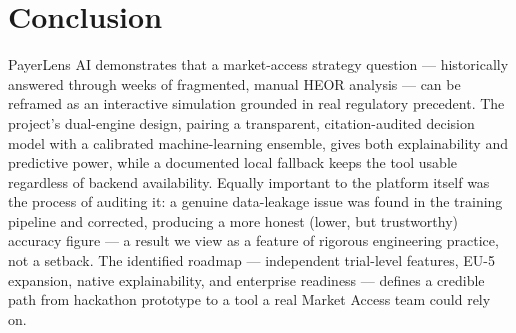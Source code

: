 \documentclass[11pt,a4paper]{article}
\begin{document}
\section{Conclusion}
PayerLens AI demonstrates that a market-access strategy question --- historically answered through
weeks of fragmented, manual HEOR analysis --- can be reframed as an interactive simulation grounded
in real regulatory precedent. The project's dual-engine design, pairing a transparent,
citation-audited decision model with a calibrated machine-learning ensemble, gives both
explainability and predictive power, while a documented local fallback keeps the tool usable
regardless of backend availability. Equally important to the platform itself was the process of
auditing it: a genuine data-leakage issue was found in the training pipeline and corrected,
producing a more honest (lower, but trustworthy) accuracy figure --- a result we view as a feature
of rigorous engineering practice, not a setback. The identified roadmap --- independent trial-level
features, EU-5 expansion, native explainability, and enterprise readiness --- defines a credible
path from hackathon prototype to a tool a real Market Access team could rely on.

\end{document}
